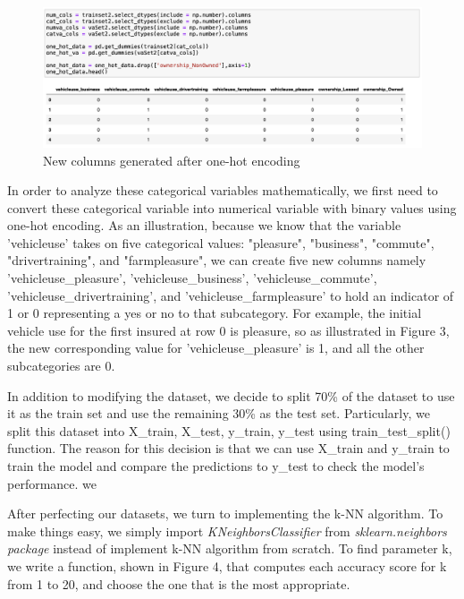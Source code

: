 \documentclass[12pt]{article} %
\theoremstyle{definition}
\begin{document}
\begin{figure}[h!]
    \centering
    \includegraphics[width=0.9\linewidth]{KNN/oneHot.png}
    \caption{New columns generated after one-hot encoding}
\end{figure}

In order to analyze these categorical variables mathematically, we first need to convert these categorical variable into numerical variable with binary values using one-hot encoding. As an illustration, because we know that the variable 'vehicleuse' takes on five categorical values: "pleasure", "business", "commute", "drivertraining", and "farmpleasure", we can create five new columns namely 'vehicleuse\_pleasure', 'vehicleuse\_business', 'vehicleuse\_commute', 'vehicleuse\_drivertraining', and 'vehicleuse\_farmpleasure' to hold an indicator of 1 or 0 representing a yes or no to that subcategory. For example, the initial vehicle use for the first insured at row 0 is pleasure, so as illustrated in Figure 3, the new corresponding value for 'vehicleuse\_pleasure' is 1, and all the other subcategories are 0.

\vspace{\baselineskip}
In addition to modifying the dataset, we decide to split 70\% of the dataset to use it as the train set and use the remaining 30\% as the test set. Particularly, we split this dataset into X\_train, X\_test, y\_train, y\_test using train\_test\_split() function. The reason for this decision is that we can use X\_train and y\_train to train the model and compare the predictions to y\_test to check the model's performance. we 

\vspace{\baselineskip}
After perfecting our datasets, we turn to implementing the k-NN algorithm. To make things easy, we simply import \emph{KNeighborsClassifier} from \emph{sklearn.neighbors package} instead of implement k-NN algorithm from scratch. To find parameter k, we write a function, shown in Figure 4, that computes each accuracy score for k from 1 to 20, and choose the one that is the most appropriate.
\end{document}
